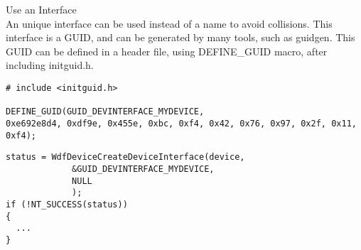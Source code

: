 \documentclass[11pt]{report}
\begin{document}
\begin{description}
\item{Use an Interface\\}
An unique interface can be used instead of a name to avoid collisions.
This interface is a GUID, and can be generated by many tools, such as
guidgen.
This GUID can be defined in a header file, using DEFINE\_GUID macro, 
after including initguid.h.
\begin{lstlisting}
# include <initguid.h>

DEFINE_GUID(GUID_DEVINTERFACE_MYDEVICE, 
0xe692e8d4, 0xdf9e, 0x455e, 0xbc, 0xf4, 0x42, 0x76, 0x97, 0x2f, 0x11, 0xf4);
\end{lstlisting}

\begin{lstlisting}
status = WdfDeviceCreateDeviceInterface(device,
             &GUID_DEVINTERFACE_MYDEVICE,
             NULL
             );
if (!NT_SUCCESS(status))
{
  ...
}
\end{lstlisting}
\end{description}
\end{document}
